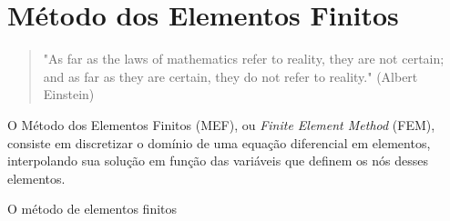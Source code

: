 \chapter{Método dos Elementos Finitos}

\begin{quote}
    "As far as the laws of mathematics refer to reality, they are not certain; and as far as they are certain, they do not refer to reality." (Albert Einstein)
\end{quote}

O Método dos Elementos Finitos (MEF), ou \textit{Finite Element Method} (FEM), consiste em discretizar o domínio de uma equação diferencial em elementos, interpolando sua solução em função das variáveis que definem os nós desses elementos. 

O método de elementos finitos